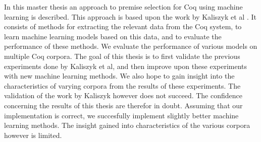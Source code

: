 In this master thesis an approach to premise selection for Coq using machine learning is described.
This approach is based upon the work by Kaliszyk et al \cite{kaliszyk2014machine}.
It consists of methods for extracting the relevant data from the Coq system, to learn
machine learning models based on this data, and to evaluate the performance of these methods.
We evaluate the performance of various models on multiple Coq corpora.
The goal of this thesis is to first validate the previous experiments done by Kaliszyk et al,
and then improve upon these experiments with new machine learning methods.
We also hope to gain insight into the characteristics of varying corpora from the results of these experiments.
The validation of the work by Kaliszyk however does not succeed.
The confidence concerning the results of this thesis are therefor in doubt.
Assuming that our implementation is correct, we succesfully implement slightly better machine learning methods.
The insight gained into characteristics of the various corpora however is limited.
